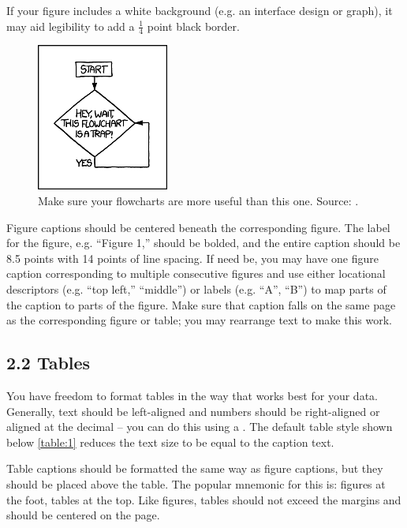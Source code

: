 {{{{If your figure includes a white background (e.g. an interface design or graph), it may aid legibility to add a $\frac{1}{4}$ point black border.

\begin{figure}[H]
  \centering
  \includegraphics[scale=0.7]{figs/example-image2}
  \caption{Make sure your flowcharts are more useful than this one. Source: .}
  \label{fig::2}
\end{figure}

Figure captions should be centered beneath the corresponding figure. The label for the figure, e.g. “Figure 1,” should be bolded, and the entire caption should be 8.5 points with 14 points of line spacing. If need be, you may have one figure caption corresponding to multiple consecutive figures and use either locational descriptors (e.g. “top left,” “middle”) or labels (e.g. “A”, “B”) to map parts of the caption to parts of the figure. Make sure that caption falls on the same page as the corresponding figure or table; you may rearrange text to make this work.

\subsection*{2.2 Tables}
You have freedom to format tables in the way that works best for your data. Generally, text should be left-aligned and numbers should be right-aligned or aligned at the decimal – you can do this using a . The default table style shown below \autoref{table:1} reduces the text size to be equal to the caption text.

Table captions should be formatted the same way as figure captions, but they should be placed above the table. The popular mnemonic for this is: figures at the foot, tables at the top. Like figures, tables should not exceed the margins and should be centered on the page.

}}}}
